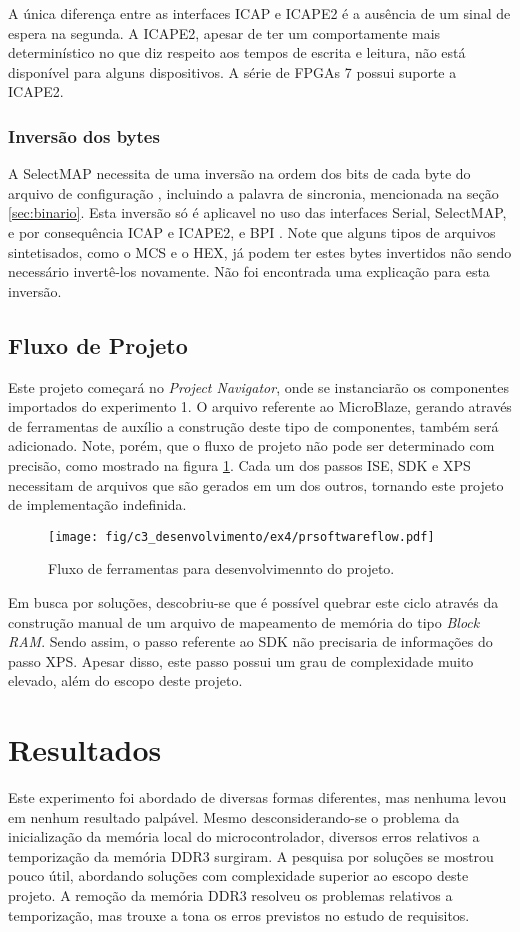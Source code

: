 \documentclass[11pt,a4paper,oneside]{book}
\begin{document}
A única diferença entre as interfaces ICAP e ICAPE2 é a ausência de um sinal de espera na segunda.
A ICAPE2, apesar de ter um comportamente mais determinístico no que diz respeito aos tempos de escrita e leitura, não está disponível para alguns dispositivos.
A série de FPGAs 7 possui suporte a ICAPE2.

\subsubsection{Inversão dos bytes}
A SelectMAP necessita de uma inversão na ordem dos bits de cada byte do arquivo de configuração \cite{xapp502}, incluindo a palavra de sincronia, mencionada na seção \ref{sec:binario}.
Esta inversão só é aplicavel no uso das interfaces Serial, SelectMAP, e por consequência ICAP e ICAPE2, e BPI \cite{ug470}.
Note que alguns tipos de arquivos sintetisados, como o MCS e o HEX, já podem ter estes bytes invertidos não sendo necessário invertê-los novamente.
Não foi encontrada uma explicação para esta inversão.

\subsection{Fluxo de Projeto}
Este projeto começará no \textit{Project Navigator}, onde se instanciarão os componentes importados do experimento 1.
O arquivo referente ao MicroBlaze, gerando através de ferramentas de auxílio a construção deste tipo de componentes, também será adicionado.
Note, porém, que o fluxo de projeto não pode ser determinado com precisão, como mostrado na figura \ref{fig:ex4:prsoftwareflow}.
Cada um dos passos ISE, SDK e XPS necessitam de arquivos que são gerados em um dos outros, tornando este projeto de implementação indefinida.

\begin{figure}[htp]
\centering
\texttt{[image: fig/c3\_desenvolvimento/ex4/prsoftwareflow.pdf]}
\caption{Fluxo de ferramentas para desenvolvimennto do projeto.}
\label{fig:ex4:prsoftwareflow}
\end{figure}

Em busca por soluções, descobriu-se que é possível quebrar este ciclo através da construção manual de um arquivo de mapeamento de memória do tipo \textit{Block RAM}.
Sendo assim, o passo referente ao SDK não precisaria de informações do passo XPS.
Apesar disso, este passo possui um grau de complexidade muito elevado, além do escopo deste projeto.

\section{Resultados}
Este experimento foi abordado de diversas formas diferentes, mas nenhuma levou em nenhum resultado palpável.
Mesmo desconsiderando-se o problema da inicialização da memória local do microcontrolador, diversos erros relativos a temporização da memória DDR3 surgiram.
A pesquisa por soluções se mostrou pouco útil, abordando soluções com complexidade superior ao escopo deste projeto.
A remoção da memória DDR3 resolveu os problemas relativos a temporização, mas trouxe a tona os erros previstos no estudo de requisitos.
\end{document}
